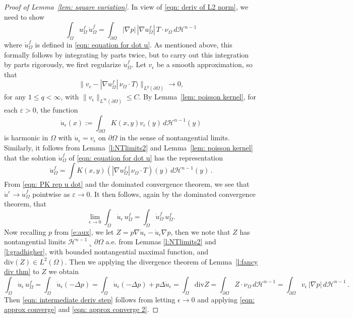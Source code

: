 \documentclass[10pt, reqno]{amsart}
\numberwithin{equation}{section}
\def\e{\varepsilon}
\def\W{\Omega}
\def\na{\nabla}
\begin{document}
\begin{proof}[Proof of Lemma~\ref{lem: square variation}]
In view of \eqref{eqn: deriv of L2 norm}, we need to show 
\begin{equation}\label{eqn: intermediate deriv step}
    \int_\W  u_{\Omega}^f \, \dot{u}_{\W}^f = \int_{\partial \W} |\na p| \, |\na u_\W^f| \, T\cdot \nu_\W \, d\mathcal{H}^{n-1}
\end{equation}
where $\dot{u}_{\W}^f$ is defined in \eqref{eqn: equation for dot u}. As mentioned above, this formally follows by integrating by parts twice, but to carry out this integration by parts rigorously, we first  regularize $\dot{u}_\W^f$.
 Let $v_{\epsilon}$ be a smooth approximation, so that 
 \begin{equation}\label{eqn: approx converge}
 \|v_{\epsilon} - |\nabla u_{\W}^f|\, \nu_\W\cdot T) \|_{L^q(\partial \W)} \to 0, 
  \end{equation}
 for any $1\leq q < \infty$, with $\| v_{\epsilon} \|_{L^{\infty}(\partial \W)} \leq C$. By Lemma~\ref{lem: poisson kernel}, for each $\e>0$, the function 
 $$\dot{u}_{\epsilon}(x) := \int_{\partial \W} K(x,y) v_\e(y) \, d\mathcal{H}^{n-1}(y)$$
 is harmonic in $\W$ with $ \dot{u}_{\epsilon} = v_{\epsilon}$ on $\partial \W$ in the sense of nontangential limits. 
Similarly, it follows from Lemma~\ref{l:NTlimits2} and Lemma~\ref{lem: poisson kernel} that the solution $\dot{u}_\W^f$ of \eqref{eqn: equation for dot u} has the representation 
\begin{equation}\label{eqn: PK rep u dot}
\dot{u}_\W^f = \int K(x,y) (|\na u_\W^f|\, \nu_\W \cdot T)(y) \, d \mathcal{H}^{n-1}(y)\,.
\end{equation}
 From \eqref{eqn: PK rep u dot} and the dominated convergence theorem, we see that $\dot{u}^\e \to \dot{u}_\W^f$ pointwise as $\e \to 0$. 
 It then follows, again by  the dominated convergence theorem, that 
 \begin{equation}
     \label{eqn: approx converge 2}
 \lim_{\epsilon \to 0}\int_{\W} \dot{u}_{\epsilon}\,  u_{\W}^f 
 = \int_{\W} \dot{u}_{\W}^f\,  u_{\W}^f. 
  \end{equation}
 Now recalling $p$ from \eqref{e:aux}, we let  
  $Z = p \nabla \dot{u}_{\epsilon}-\dot{u}_{\epsilon}\nabla p$, then we note that $Z$ has nontangential limits $\mathcal{H}^{n-1}\llcorner \partial \W$ a.e. from Lemmas \ref{l:NTlimits2} and \ref{l:gradhigher}, with bounded nontangential maximal function, and $\text{div}(Z) \in L^2(\W)$. Then %
  we applying the divergence theorem of Lemma~\ref{l:fancy div thm} to $Z$ we obtain 
 \[
 \int_{\W} \dot{u}_{\epsilon}\,  u_{\Omega}^f 
 = \int_{\W} \dot{u}_{\epsilon} (-\Delta p)
 = \int_{\W} \dot{u}_{\epsilon} (-\Delta p) + p \Delta \dot{u}_{\epsilon} 
 = \int_{\W} \text{div} Z  
 = \int_{\partial \W} Z \cdot \nu_\W \, d\mathcal{H}^{n-1}
 = \int_{\partial \W} v_{\epsilon} \,|\nabla p| \,d\mathcal{H}^{n-1}\,.
 \]
 Then \eqref{eqn: intermediate deriv step} follows from letting $\epsilon \to 0$ and applying \eqref{eqn: approx converge} and \eqref{eqn: approx converge 2}.
\end{proof}
\end{document}
